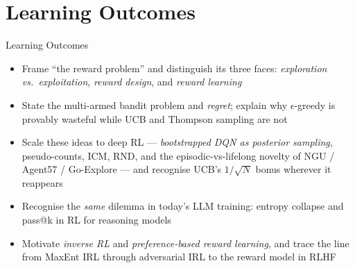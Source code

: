 \section{Learning Outcomes}
\begin{frame}{Learning Outcomes}
    \begin{itemize}
        \setlength{\itemsep}{0.7em}
        \item Frame ``the reward problem'' and distinguish its three faces:
              \emph{exploration vs.\ exploitation}, \emph{reward design}, and \emph{reward learning}
        \item State the multi-armed bandit problem and \emph{regret}; explain why
              $\epsilon$-greedy is provably wasteful while UCB and Thompson sampling are not
        \item Scale these ideas to deep RL --- \emph{bootstrapped DQN as posterior
              sampling}, pseudo-counts, ICM, RND, and the episodic-vs-lifelong novelty of
              NGU / Agent57 / Go-Explore --- and recognise UCB's $1/\sqrt{N}$ bonus wherever it reappears
        \item Recognise the \emph{same} dilemma in today's LLM training: entropy collapse
              and pass@k in RL for reasoning models
        \item Motivate \emph{inverse RL} and \emph{preference-based reward learning}, and
              trace the line from MaxEnt IRL through adversarial IRL to the reward model
              in RLHF
    \end{itemize}
\end{frame}
